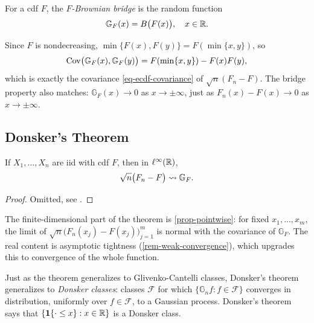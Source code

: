 \documentclass[a4paper,12pt]{article}
\begin{document}
\begin{definition}
	For a \gls{cdf} $F$, the \emph{$F$-Brownian bridge} is the random function
	\begin{align}
		\mathbb G_F(x)=B\bigl(F(x)\bigr),
		\quad x\in\mathbb{R}.
	\end{align}
\end{definition}

\begin{remark}
	Since $F$ is nondecreasing, $\min\{F(x), F(y)\}=F(\min\{x,y\})$, so
	\begin{align}
		\operatorname{\text{\textrm{\upshape{Cov}}}}\bigl(\mathbb G_F(x),\mathbb G_F(y)\bigr)=F(\min\{x,y\})-F(x)F(y),
	\end{align}
	which is exactly the covariance \eqref{eq-ecdf-covariance} of $\sqrt n(F_n-F)$.
	The bridge property also matches: $\mathbb G_F(x)\to0$ as $x\to\pm\infty$, just as $F_n(x)-F(x)\to0$ as $x\to\pm\infty$.
\end{remark}

\subsection{Donsker's Theorem}

\begin{theorem}[Donsker]\label{thm-donsker}
	If $X_1,...,X_n$ are \gls{iid} with \gls{cdf} $F$, then in $\ell^\infty(\mathbb{R})$,
	\begin{align}
		\sqrt n\bigl(F_n-F\bigr)\overset{}{\leadsto}\mathbb G_F.
	\end{align}
\end{theorem}
\begin{proof}
	Omitted, see \textcite[Theorem 19.3]{van-der-vaart-1998}.
\end{proof}

\begin{remark}
	The finite-dimensional part of the theorem is \autoref{prop-pointwise}:
	for fixed $x_1,...,x_m$, the limit of $\sqrt n\bigl(F_n(x_j)-F(x_j)\bigr)_{j=1}^m$ is normal with the covariance of $\mathbb G_F$.
	The real content is asymptotic tightness (\autoref{rem-weak-convergence}), which upgrades this to convergence of the whole function.
\end{remark}

\begin{remark}
	Just as the  theorem generalizes to Glivenko-Cantelli classes,
	Donsker's theorem generalizes to \emph{Donsker classes}:
	classes $\mathcal F$ for which $\{\mathbb G_nf:f\in\mathcal F\}$ converges in distribution, uniformly over $f\in\mathcal F$, to a Gaussian process.
	Donsker's theorem says that $\{\mathbf{1}\{\cdot\le x\}:x\in\mathbb{R}\}$ is a Donsker class.
\end{remark}
\end{document}
